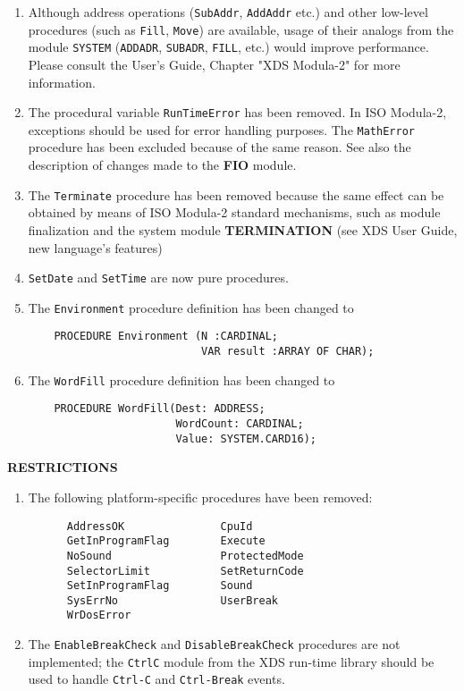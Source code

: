 \begin{enumerate}
\item Although address operations (\verb'SubAddr', \verb'AddAddr' etc.) and
      other low-level procedures (such as \verb'Fill', \verb'Move') are 
      available, usage of their analogs from the module \verb'SYSTEM'
      (\verb'ADDADR', \verb'SUBADR', \verb'FILL', etc.) would improve
      performance. Please consult the User's Guide, Chapter "XDS Modula-2" 
      for more information.

\item The procedural variable \verb'RunTimeError' has been removed. In ISO
      Modula-2, exceptions should be used for error handling purposes.
      The \verb'MathError' procedure has been excluded because of
      the same reason. See also the description of changes made to the {\bf FIO} module.

\item The \verb'Terminate' procedure has been removed because the same effect
      can be obtained by means of ISO Modula-2 standard mechanisms, such as module
      finalization and the system module {\bf TERMINATION}
      (see XDS User Guide, new language's features)

\item \verb'SetDate' and \verb'SetTime' are now pure procedures.

\item The \verb'Environment' procedure definition has been changed to

\verb'    PROCEDURE Environment (N :CARDINAL;'\\
\verb'                           VAR result :ARRAY OF CHAR);'

\item The \verb'WordFill' procedure definition has been changed to

\verb'    PROCEDURE WordFill(Dest: ADDRESS;'\\
\verb'                       WordCount: CARDINAL;'\\
\verb'                       Value: SYSTEM.CARD16);'
\end{enumerate}

{\bf RESTRICTIONS}

\begin{enumerate}
\item The following platform-specific procedures have been removed:
\begin{verbatim}
      AddressOK               CpuId
      GetInProgramFlag        Execute
      NoSound                 ProtectedMode
      SelectorLimit           SetReturnCode
      SetInProgramFlag        Sound
      SysErrNo                UserBreak
      WrDosError
\end{verbatim}

\item The \verb'EnableBreakCheck' and \verb'DisableBreakCheck' procedures are
      not implemented; the \verb'CtrlC' module from the XDS run-time library
      should be used to handle \verb'Ctrl-C' and \verb'Ctrl-Break' events.
\end{enumerate}

